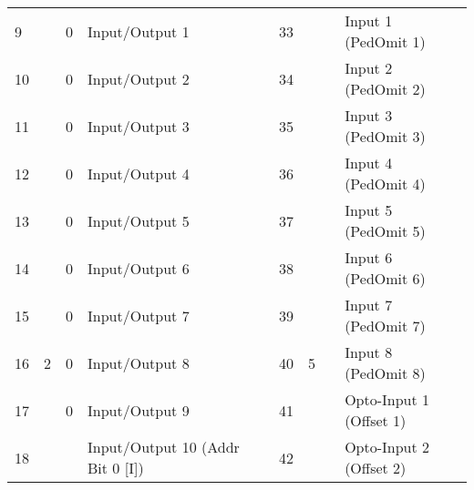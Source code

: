 \documentclass[]{article}
\begin{document}
\begin{landscape}
\begin{table}[]
\begin{tabular}{lllllllll}
			9            &                     & 0              & \cellcolor[HTML]{EFEFEF}Input/Output 1          &                    & 33           &                     &                & Input 1 (PedOmit 1)                                \\
			10           &                     & 0              & \cellcolor[HTML]{EFEFEF}Input/Output 2          &                    & 34           &                     &                & Input 2 (PedOmit 2)                                \\
			11           &                     & 0              & \cellcolor[HTML]{EFEFEF}Input/Output 3          &                    & 35           &                     &                & Input 3 (PedOmit 3)                                \\
			12           &                     & 0              & \cellcolor[HTML]{EFEFEF}Input/Output 4          &                    & 36           &                     &                & Input 4 (PedOmit 4)                                \\
			13           &                     & 0              & \cellcolor[HTML]{EFEFEF}Input/Output 5          &                    & 37           &                     &                & Input 5 (PedOmit 5)                                \\
			14           &                     & 0              & \cellcolor[HTML]{EFEFEF}Input/Output 6          &                    & 38           &                     &                & Input 6 (PedOmit 6)                                \\
			15           &                     & 0              & \cellcolor[HTML]{EFEFEF}Input/Output 7          &                    & 39           &                     &                & Input 7 (PedOmit 7)                                \\
			16           & \multirow{-8}{*}{2} & 0              & \cellcolor[HTML]{EFEFEF}Input/Output 8          &                    & 40           & \multirow{-8}{*}{5} &                & Input 8 (PedOmit 8)                                \\ \cline{1-4} \cline{6-9} 
			17           &                     & 0              & \cellcolor[HTML]{EFEFEF}Input/Output 9          &                    & 41           &                     &                & Opto-Input 1 (Offset 1)                            \\ \cline{3-4}
			18           &                     &                & Input/Output 10 (Addr Bit 0 {[}I{]})            &                    & 42           &                     &                & Opto-Input 2 (Offset 2)                            \\

\end{tabular}
\end{table}
\end{landscape}
\end{document}
